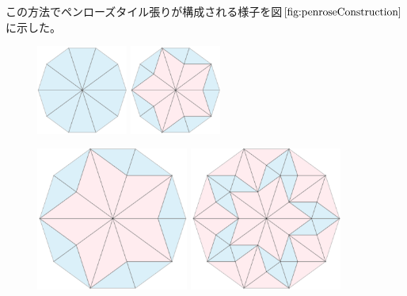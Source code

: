 \documentclass[lualatex,12pt,ja=standard]{bxjsreport}
\begin{document}
この方法でペンローズタイル張りが構成される様子を図$\ref{fig:penroseConstruction}$
に示した。
\begin{figure}[H]
 \begin{center}
  \includegraphics[bb=0 0 356 347,clip,width=3cm]{figures/initPenrose.png}
  \hspace{2cm}
  \includegraphics[bb=0 0 356 347,clip,width=3cm]{figures/div1.png}

  \vspace{1cm}
  \includegraphics[bb=0 0 580 546,clip,width=5cm]{figures/div1inf1.png}
  \includegraphics[bb=0 0 580 546,clip,width=5cm]{figures/div2.png}


\end{center}
\end{figure}
\end{document}
